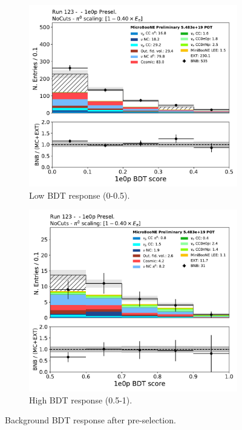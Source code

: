 \begin{figure}[H] 
\begin{center}
    \begin{subfigure}[b]{0.45\textwidth}
    \centering
    \includegraphics[width=1.00\textwidth]{1e0p/run123_bdt/bkg_score_low_bdt.pdf}
    \caption{\label{fig:1e0p:bdt:bkgscore:slice} Low BDT response (0-0.5).}
    \end{subfigure}
    \begin{subfigure}[b]{0.45\textwidth}
    \centering
    \includegraphics[width=1.00\textwidth]{1e0p/run123_bdt/bkg_score_high_bdt.pdf}
    \caption{\label{fig:1e0p:bdt:bkgscore:presel} High BDT response (0.5-1).}
    \end{subfigure}
\caption{\label{fig:1e0p:bdt:bkgscore} Background BDT response after \zpsel pre-selection.}
\end{center}
\end{figure}


